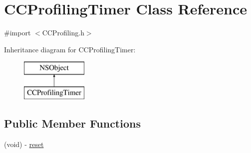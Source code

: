 \hypertarget{interface_c_c_profiling_timer}{\section{C\-C\-Profiling\-Timer Class Reference}
\label{interface_c_c_profiling_timer}
}


{\ttfamily \#import $<$C\-C\-Profiling.\-h$>$}

Inheritance diagram for C\-C\-Profiling\-Timer\-:\begin{figure}[H]
\begin{center}
\leavevmode
\includegraphics[height=2.000000cm]{interface_c_c_profiling_timer}
\end{center}
\end{figure}
\subsection*{Public Member Functions}
\begin{DoxyCompactItemize}
\item 
(void) -\/ \hyperlink{interface_c_c_profiling_timer_a6601f85377b89ff4c33131de30b37529}{reset}
\end{DoxyCompactItemize}

